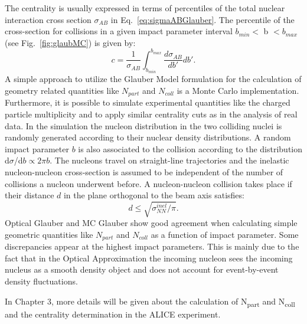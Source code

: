The centrality is usually expressed in terms of percentiles of the total nuclear 
interaction cross section $\sigma_{AB}$ in Eq.~\ref{eq:sigmaABGlauber}.
The percentile of the cross-section for collisions in a given impact parameter
interval $b_{min}<$ b $<b_{max}$ (see Fig.~\ref{fig:glaubMC}) is given by:
\begin{equation}
c=\frac{1}{\sigma_{AB}}\int_{b_{min}}^{b_{max}} \frac{d\sigma_{AB}}{db'}db'.
\end{equation}
A simple approach to utilize the Glauber Model formulation for the
 calculation of geometry related quantities like $N_{part}$ and $N_{coll}$
is a Monte Carlo implementation. 
Furthermore, it is possible to simulate experimental quantities 
like the charged particle multiplicity and to apply similar centrality cuts as in the analysis of real data. 
In the simulation the nucleon distribution in the two colliding nuclei is randomly generated
according to their nuclear density distributions.
A random impact parameter $b$ is also associated to the collision according to the distribution
d$\sigma$/d$b \propto 2\pi b$. The nucleons travel on straight-line
trajectories and the inelastic nucleon-nucleon cross-section is assumed to be independent
of the number of collisions a nucleon underwent before. A nucleon-nucleon collision takes place if
their distance $d$ in the plane orthogonal to the beam axis satisfies:
\begin{equation}
d \leq \sqrt{\sigma^{inel}_{NN}/\pi}.
\end{equation}
Optical Glauber and MC Glauber show good agreement when calculating 
simple geometric quantities like $N_{part}$ and $N_{coll}$ as
a function of impact parameter. Some discrepancies appear at the highest impact parameters.
This is mainly due to the fact that in the Optical Approximation the incoming nucleon sees the incoming nucleus as a smooth density object and does not account for event-by-event density fluctuations.



In Chapter 3, more details will be given about the calculation 
of N\textsubscript{part} and N\textsubscript{coll} and the centrality 
determination in the ALICE experiment.


